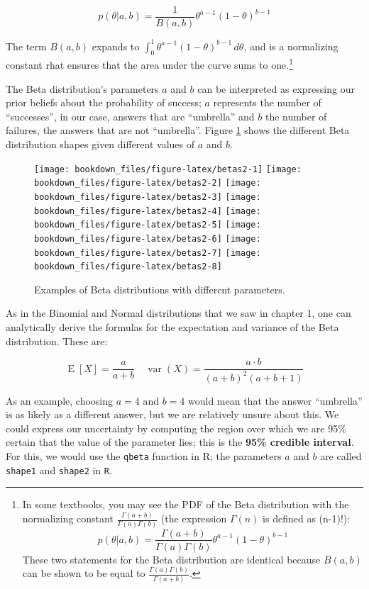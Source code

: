 \documentclass[12pt,]{krantz}
\theoremstyle{definition}
\theoremstyle{definition}
\theoremstyle{definition}
\theoremstyle{remark}
\begin{document}
\begin{equation}
p(\theta|a,b)=  \frac{1}{B(a,b)} \theta^{a - 1} (1-\theta)^{b-1}   
\label{eq:beta}
\end{equation}

The term \(B(a,b)\) expands to \(\int_0^1 \theta^{a-1}(1-\theta)^{b-1}\, d\theta\), and is a normalizing constant rhat ensures that the area under the curve sums to one.\footnote{In some textbooks, you may see the PDF of the Beta distribution with the normalizing constant \(\frac{\Gamma(a+b)}{\Gamma(a)\Gamma(b)}\) (the expression \(\Gamma(n)\) is defined as (n-1)!): \[p(\theta|a,b)=  \frac{\Gamma(a+b)}{\Gamma(a)\Gamma(b)} \theta^{a - 1} (1-\theta)^{b-1}\] These two statements for the Beta distribution are identical because \(B(a,b)\) can be shown to be equal to \(\frac{\Gamma(a)\Gamma(b)}{\Gamma(a+b)}\).}

The Beta distribution's parameters \(a\) and \(b\) can be interpreted as expressing our prior beliefs about the probability of success; \(a\) represents the number of ``successes'', in our case, answers that are ``umbrella'' and \(b\) the number of failures, the answers that are not ``umbrella''. Figure \ref{fig:betas2} shows the different Beta distribution shapes given different values of \(a\) and \(b\).

\begin{figure}
\texttt{[image: bookdown\_files/figure-latex/betas2-1]} \texttt{[image: bookdown\_files/figure-latex/betas2-2]} \texttt{[image: bookdown\_files/figure-latex/betas2-3]} \texttt{[image: bookdown\_files/figure-latex/betas2-4]} \texttt{[image: bookdown\_files/figure-latex/betas2-5]} \texttt{[image: bookdown\_files/figure-latex/betas2-6]} \texttt{[image: bookdown\_files/figure-latex/betas2-7]} \texttt{[image: bookdown\_files/figure-latex/betas2-8]} \caption{Examples of Beta distributions with different parameters.}\label{fig:betas2}
\end{figure}

As in the Binomial and Normal distributions that we saw in chapter 1, one can analytically derive the formulas for the expectation and variance of the Beta distribution. These are:

\begin{equation}
\operatorname{E}[X] = \frac{a}{a+b} \quad \operatorname{var}(X)=\frac {a \cdot b }{(a + b )^{2}(a + b +1)}
\label{eq:meanvar}
\end{equation}

As an example, choosing \(a=4\) and \(b=4\) would mean that the answer ``umbrella'' is as likely as a different answer, but we are relatively unsure about this. We could express our uncertainty by computing the region over which we are 95\% certain that the value of the parameter lies; this is the \textbf{95\% credible interval}. For this, we would use the \texttt{qbeta} function in R; the parameters \(a\) and \(b\) are called \texttt{shape1} and \texttt{shape2} in \texttt{R}.
\end{document}
